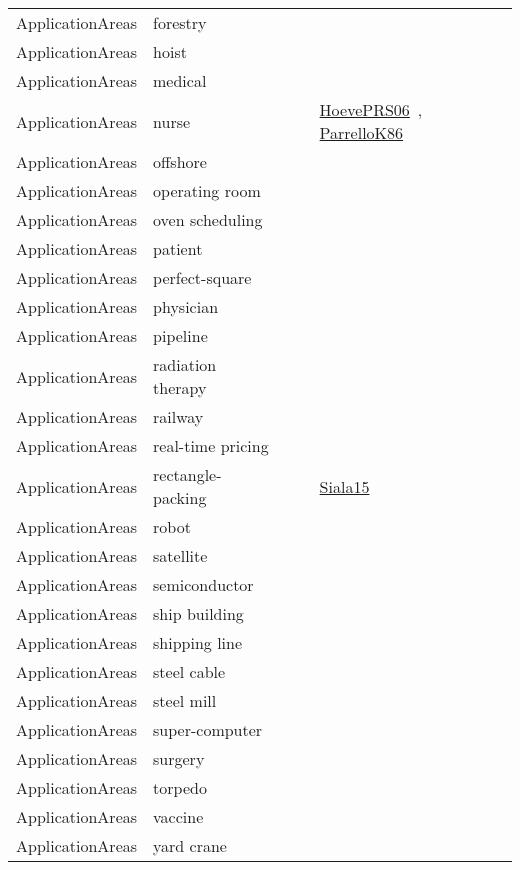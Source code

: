 {\begin{longtable}{lp{3cm}>{\raggedright\arraybackslash}p{6cm}>{\raggedright\arraybackslash}p{6cm}>{\raggedright\arraybackslash}p{8cm}}
ApplicationAreas & forestry &  &  & \\
ApplicationAreas & hoist &  &  & \\
ApplicationAreas & medical &  &  & \\
ApplicationAreas & nurse &  &  & \href{cars/works/HoevePRS06.pdf}{HoevePRS06}~\cite{HoevePRS06}, \href{cars/works/ParrelloK86.pdf}{ParrelloK86}~\cite{ParrelloK86}\\
ApplicationAreas & offshore &  &  & \\
ApplicationAreas & operating room &  &  & \\
ApplicationAreas & oven scheduling &  &  & \\
ApplicationAreas & patient &  &  & \\
ApplicationAreas & perfect-square &  &  & \\
ApplicationAreas & physician &  &  & \\
ApplicationAreas & pipeline &  &  & \\
ApplicationAreas & radiation therapy &  &  & \\
ApplicationAreas & railway &  &  & \\
ApplicationAreas & real-time pricing &  &  & \\
ApplicationAreas & rectangle-packing &  &  & \href{cars/works/Siala15.pdf}{Siala15}~\cite{Siala15}\\
ApplicationAreas & robot &  &  & \\
ApplicationAreas & satellite &  &  & \\
ApplicationAreas & semiconductor &  &  & \\
ApplicationAreas & ship building &  &  & \\
ApplicationAreas & shipping line &  &  & \\
ApplicationAreas & steel cable &  &  & \\
ApplicationAreas & steel mill &  &  & \\
ApplicationAreas & super-computer &  &  & \\
ApplicationAreas & surgery &  &  & \\
ApplicationAreas & torpedo &  &  & \\
ApplicationAreas & vaccine &  &  & \\
ApplicationAreas & yard crane &  &  & \\
\end{longtable}
}

